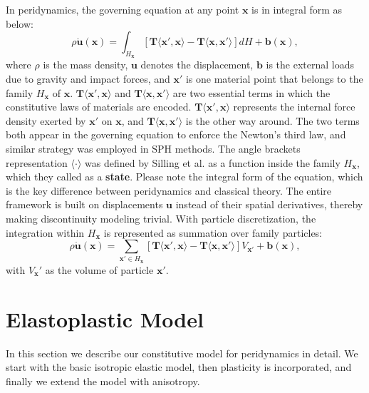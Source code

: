 In peridynamics, the governing equation at any point $\mathbf{x}$ is  in integral form as below:
\begin{equation}
\rho\ddot{\mathbf{u}}(\mathbf{x}) = \int_{H_\mathbf{x}}[\mathbf{T}\langle\mathbf{x}',\mathbf{x}\rangle - \mathbf{T}\langle\mathbf{x},\mathbf{x}'\rangle]dH+\mathbf{b}(\mathbf{x}),
\label{eq:1}
\end{equation}
where $\rho$ is the mass density, $\mathbf{u}$ denotes the displacement, $\mathbf{b}$ is the external loads due to gravity and impact forces, and $\mathbf{x}'$ is one material point that belongs to the family $H_{\mathbf{x}}$ of $\mathbf{x}$. $\mathbf{T}\langle\mathbf{x}',\mathbf{x}\rangle$ and $\mathbf{T}\langle\mathbf{x},\mathbf{x}'\rangle$ are two essential terms in which the constitutive laws of materials are encoded. $\mathbf{T}\langle\mathbf{x}',\mathbf{x}\rangle$ represents the internal force density exerted by $\mathbf{x'}$ on $\mathbf{x}$, and $\mathbf{T}\langle\mathbf{x},\mathbf{x}'\rangle$ is the other way around. The two terms both appear in the governing equation to enforce the Newton's third law, and similar strategy was employed in SPH methods\cite{Muller:2003:PFS:846276.846298}. The angle brackets representation $\langle\cdot\rangle$ was defined by Silling et al. \cite{silling2007peridynamic} as a function inside the family $H_\mathbf{x}$, which they called as a \textbf{state}. Please note the integral form of the equation, which is the key difference between peridynamics and classical theory. The entire framework is built on displacements $\mathbf{u}$ instead of their spatial derivatives, thereby making discontinuity modeling trivial. With particle discretization, the integration within $H_\mathbf{x}$ is represented as summation over family particles:
\begin{equation}
\rho\ddot{\mathbf{u}}(\mathbf{x}) = \sum_{\mathbf{x}'\in H_\mathbf{x}}[\mathbf{T}\langle\mathbf{x}',\mathbf{x}\rangle - \mathbf{T}\langle\mathbf{x},\mathbf{x}'\rangle]V_{\mathbf{x}'}+\mathbf{b}(\mathbf{x}),
\label{eq:1_sup}
\end{equation}
with $V_\mathbf{x}'$ as the volume of particle $\mathbf{x}'$.

\section{Elastoplastic Model}

In this section we describe our constitutive model for peridynamics in detail. We start with the basic isotropic elastic model, then plasticity is incorporated, and finally we extend the model with anisotropy.

